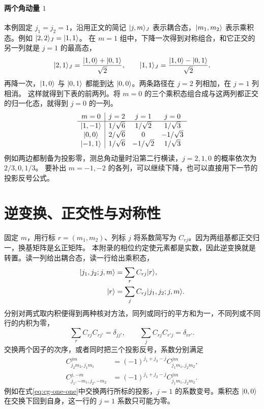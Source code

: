 \paragraph*{两个角动量 $1$}
本例固定 $j_1 = j_2 = 1$，沿用正文的简记 $\lvert j,m\rangle_J$ 表示耦合态，$\lvert m_1,m_2\rangle$ 表示乘积态。例如 $\lvert2,2\rangle_J = \lvert1,1\rangle$。
在 $m = 1$ 组中，下降一次得到对称组合，和它正交的另一列就是 $j = 1$ 的最高态，
\begin{equation}
    \lvert2,1\rangle_J = \frac{\lvert1,0\rangle + \lvert0,1\rangle}{\sqrt2},\qquad
    \lvert1,1\rangle_J = \frac{\lvert1,0\rangle - \lvert0,1\rangle}{\sqrt2}.
\end{equation}
再降一次，$\lvert1,0\rangle$ 与 $\lvert0,1\rangle$ 都能到达 $\lvert0,0\rangle$。两条路径在 $j = 2$ 列相加，在 $j = 1$ 列相消。
这样就得到下表的前两列。将 $m = 0$ 的三个乘积态组合成与这两列都正交的归一化态，就得到 $j = 0$ 的一列。
\begin{equation}
    \begin{array}{c|ccc}
      m = 0 & j = 2 & j = 1 & j = 0 \\ \hline
      \lvert1,-1\rangle & 1/\sqrt6 & 1/\sqrt2 & 1/\sqrt3 \\
      \lvert0,0\rangle  & 2/\sqrt6 & 0 & -1/\sqrt3 \\
      \lvert-1,1\rangle & 1/\sqrt6 & -1/\sqrt2 & 1/\sqrt3
    \end{array}
    \label{eq:cg-one-one}
\end{equation}
例如两边都制备为投影零，测总角动量时沿第二行横读，$j = 2,1,0$ 的概率依次为 $2/3,0,1/3$。
要补出 $m = -1,-2$ 的各列，可以继续下降，也可以直接用下一节的投影反号公式。

\section{逆变换、正交性与对称性}
固定 $m$，用行标 $r = (m_1,m_2)$、列标 $j$ 将系数简写为 $C_{rj}$。因为两组基都正交归一，换基矩阵是幺正矩阵。
本附录的相位约定使元素都是实数，因此逆变换就是转置。读一列给出耦合态，读一行给出乘积态，
\begin{subequations}
    \begin{align}
        \lvert j_1,j_2;j,m\rangle &= \sum_r C_{rj}\lvert r\rangle,\\
        \lvert r\rangle &= \sum_j C_{rj}\lvert j_1,j_2;j,m\rangle.
    \end{align}
\end{subequations}
分别对两式取内积便得到两种核对方法，同列或同行的平方和为一，不同列或不同行的内积为零，
\begin{equation}
    \sum_r C_{rj}C_{rj'} = \delta_{jj'},\qquad
    \sum_j C_{rj}C_{r'j} = \delta_{rr'}.
\end{equation}
交换两个因子的次序，或者同时把三个投影反号，系数分别满足
\begin{equation}
    \begin{alignedat}{1}
      C^{jm}_{j_2m_2,j_1m_1} &= (-1)^{j_1+j_2-j}C^{jm}_{j_1m_1,j_2m_2},\\
      C^{j,-m}_{j_1,-m_1,j_2,-m_2} &= (-1)^{j_1+j_2-j}C^{jm}_{j_1m_1,j_2m_2}.
    \end{alignedat}
\end{equation}
例如在式\eqref{eq:cg-one-one}中交换两行所标的投影，$j = 1$ 的系数变号。乘积态 $\lvert0,0\rangle$ 在交换下回到自身，这一行的 $j = 1$ 系数只可能为零。

